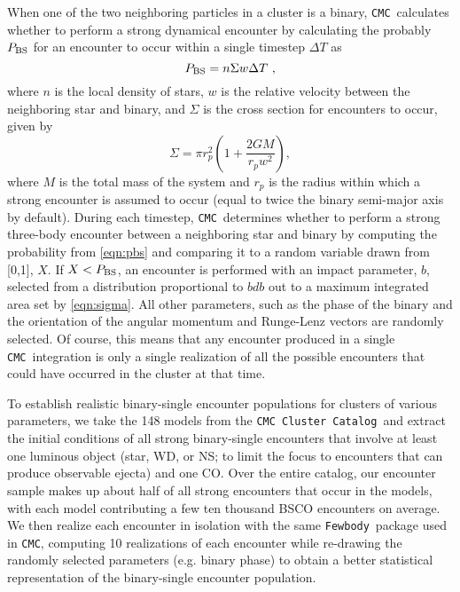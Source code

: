 \documentclass[twocolumn]{aastex631}
\newcommand{\CMC}{\texttt{CMC}}
\newcommand{\CMCcat}{\texttt{CMC Cluster Catalog}}
\newcommand{\fewbody}{\texttt{Fewbody}}
\begin{document}
When one of the two neighboring particles in a cluster is a binary, \CMC\ calculates whether to perform a strong dynamical encounter by calculating the probably $P_{\rm BS}$ for an encounter to occur within a single timestep $\Delta T$ as
\begin{equation}
P_{\rm BS} = n \Sigma w \Delta T~,
\label{eqn:pbs}
\end{equation}
where $n$ is the local density of stars, $w$ is the relative velocity between the neighboring star and binary, and $\Sigma$ is the cross section for encounters to occur, given by
\begin{equation}
\Sigma = \pi r_p^2 \left(1+\frac{2 G M}{r_p w^2}\right),
\label{eqn:sigma}
\end{equation}
where $M$ is the total mass of the system and $r_p$ is the radius within which a strong encounter is assumed to occur (equal to twice the binary semi-major axis by default).  
During each timestep, \CMC\ determines whether to perform a strong three-body encounter between a neighboring star and binary by computing the probability from \ref{eqn:pbs} and comparing it to a random variable drawn from [0,1], $X$.  If $X < P_{\rm BS}$, an encounter is performed with an impact parameter, $b$, selected from a distribution proportional to $b db$ out to a maximum integrated area set by \ref{eqn:sigma}.  All other parameters, such as the phase of the binary and the orientation of the angular momentum and Runge-Lenz vectors are randomly selected.  Of course, this means that any encounter produced in a single \CMC\ integration is only a single realization of all the possible encounters that could have occurred in the cluster at that time.

To establish realistic binary-single encounter populations for clusters of various parameters, we take the 148 models from the \CMCcat\ and extract the initial conditions of all strong binary-single encounters that involve at least one luminous object (star, WD, or NS; to limit the focus to encounters that can produce observable ejecta) and one CO.
Over the entire catalog, our encounter sample makes up about half of all strong encounters that occur in the models, with each model contributing a few ten thousand BSCO encounters on average.
We then realize each encounter in isolation with the same \fewbody\ package used in \CMC, computing 10 realizations of each encounter while re-drawing the randomly selected parameters (e.g. binary phase) to obtain a better statistical representation of the binary-single encounter population.
\end{document}
